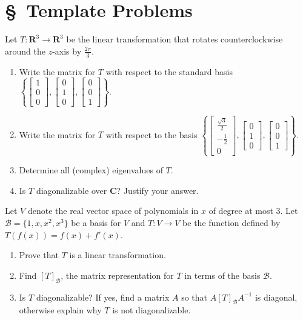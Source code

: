 \documentclass[11pt,twoside,openany]{memoir}
\begin{document}
\section*{\S\ Template Problems}
\begin{exercise}
    Let $T:\mathbf{R}^3\to \mathbf{R}^3$ be the linear transformation that rotates counterclockwise around the $z$-axis by $\frac{2\pi}{3}$.
    \begin{enumerate}[label = (\arabic*)]
        \item Write the matrix for $T$ with respect to the standard basis $\left\{\begin{bmatrix} 1 \\ 0 \\ 0 \end{bmatrix},\begin{bmatrix} 0 \\ 1 \\ 0\end{bmatrix},\begin{bmatrix} 0 \\ 0 \\ 1\end{bmatrix}\right\}$.
        \item Write the matrix for $T$ with respect to the basis $\left\{\begin{bmatrix} \frac{\sqrt{3}}{2} \\ -\frac{1}{2} \\ 0 \end{bmatrix},\begin{bmatrix} 0 \\ 1 \\ 0\end{bmatrix},\begin{bmatrix} 0 \\ 0 \\ 1\end{bmatrix}\right\}$.
        \item Determine all (complex) eigenvalues of $T$.
        \item Is $T$ diagonalizable over $\mathbf{C}$? Justify your answer.
    \end{enumerate}
    \end{exercise}
    
    \begin{exercise}
    Let $V$ denote the real vector space of polynomials in $x$ of degree at most 3. Let $\mathcal{B}=\{1, x, x^2, x^3\}$ be a basis for $V$ and $T:V\to V$ be the function defined by $T(f(x))=f(x)+f'(x)$.
    \begin{enumerate}[label = (\arabic*)]
        \item Prove that $T$ is a linear transformation.
        \item Find $[T]_{\mathcal{B}}$, the matrix representation for $T$ in terms of the basis $\mathcal{B}$.
        \item Is $T$ diagonalizable? If yes, find a matrix $A$ so that $A[T]_{\mathcal{B}}A^{-1}$ is diagonal, otherwise explain why $T$ is not diagonalizable.
    \end{enumerate}
    \end{exercise}
    
\end{document}
